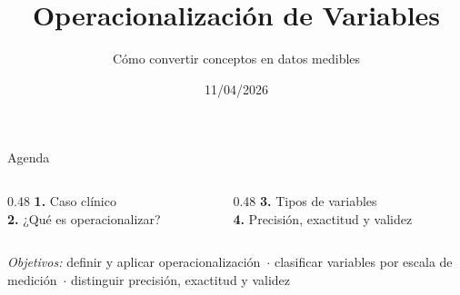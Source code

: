 \documentclass[aspectratio=169, 12pt, xcolor=table]{beamer}
\title{Operacionalización de Variables}
\subtitle{Cómo convertir conceptos en datos medibles}
\author{}
\institute{%
  ABC of Research\\
  Darwin del Castillo Fernández
}
\date{11/04/2026}
\begin{document}

\maketitle


\begin{frame}{Agenda}
  \begin{columns}[T]
    \begin{column}{0.48\textwidth}
      \textbf{\textcolor{accent}{1.}} Caso clínico\\[4pt]
      \textbf{\textcolor{accent}{2.}} ¿Qué es operacionalizar?
    \end{column}
    \begin{column}{0.48\textwidth}
      \textbf{\textcolor{accent}{3.}} Tipos de variables\\[4pt]
      \textbf{\textcolor{accent}{4.}} Precisión, exactitud y validez
    \end{column}
  \end{columns}

  \vspace{8pt}
  \begin{nota}
    \textit{Objetivos:}
    definir y aplicar operacionalización~$\cdot$
    clasificar variables por escala de medición~$\cdot$
    distinguir precisión, exactitud y validez
  \end{nota}
\end{frame}
\end{document}
